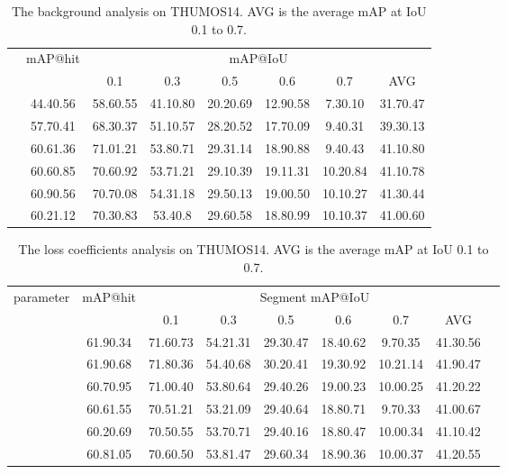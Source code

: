 \documentclass[runningheads]{llncs}
\begin{document}
	
	
	\begin{table}[!t]
		\centering
		\small
		\setlength\extrarowheight{2pt}
		\caption{The background  analysis on THUMOS14. AVG is the average mAP at IoU 0.1 to 0.7.}
		\begin{tabular}{>{\centering} m{0.8cm}|c|cccccc}
			\hline
			\multicolumn{1}{c|}{\multirow{2}{*}{}} & \multirow{2}{*}{mAP@hit} &\multicolumn{6}{c}{mAP@IoU }                             \\ \cline{3-8}
			\multicolumn{1}{c|}{}   & & 0.1  & 0.3 & 0.5 & 0.6  & 0.7  & AVG     \\ \hline
			0.0 & 44.40.56 & 58.60.55 & 41.10.80 & 20.20.69 & 12.90.58 & 7.30.10 & 31.70.47 \\
			1.0 & 57.70.41 & 68.30.37 & 51.10.57 & 28.20.52 & 17.70.09 & 9.40.31 & 39.30.13 \\ 
			3.0 & 60.61.36 & 71.01.21 & 53.80.71 & 29.31.14 & 18.90.88 & 9.40.43 & 41.10.80 \\ 
			5.0 & 60.60.85 & 70.60.92 & 53.71.21 & 29.10.39 & 19.11.31 & 10.20.84 & 41.10.78 \\ 
			7.0 & 60.90.56 & 70.70.08 & 54.31.18 & 29.50.13 & 19.00.50 & 10.10.27 & 41.30.44 \\ 
			9.0 & 60.21.12 & 70.30.83 & 53.40.8 & 29.60.58 & 18.80.99 & 10.10.37 & 41.00.60 \\ \hline
			
		\end{tabular}
		\label{tab:eta}
	\end{table}
	
	
	
	\begin{table}[!t]
		\centering
		\small
		\setlength\extrarowheight{2pt}
		\caption{The loss coefficients analysis on THUMOS14. AVG is the average mAP at IoU 0.1 to 0.7.}
		\begin{tabular}{l|c|ccccccc}
			\hline
			\multirow{2}{*}{parameter} & \multirow{2}{*}{mAP@hit} & \multicolumn{6}{c}{Segment mAP@IoU} \\ \cline{3-8}
			\multicolumn{1}{c|}{}   & & 0.1 & 0.3 & 0.5 & 0.6  & 0.7  & AVG   \\ \hline
			 & 61.90.34 & 71.60.73 & 54.21.31 & 29.30.47 & 18.40.62 & 9.70.35 & 41.30.56 \\ 
			 & 61.90.68 & 71.80.36 & 54.40.68 & 30.20.41 & 19.30.92 & 10.21.14 & 41.90.47 \\ 
			 & 60.70.95 & 71.00.40 & 53.80.64 & 29.40.26 & 19.00.23 & 10.00.25 & 41.20.22 \\ \hline
			 & 60.61.55 & 70.51.21 & 53.21.09 & 29.40.64 & 18.80.71 & 9.70.33 & 41.00.67 \\ 
			 & 60.20.69 & 70.50.55 & 53.70.71 & 29.40.16 & 18.80.47 & 10.00.34 & 41.10.42 \\ 
			 & 60.81.05 & 70.60.50 & 53.81.47 & 29.60.34 & 18.90.36 & 10.00.37 & 41.20.55 \\ \hline
			
		\end{tabular}
		\label{tab:hypers}
	\end{table}
	
\end{document}
